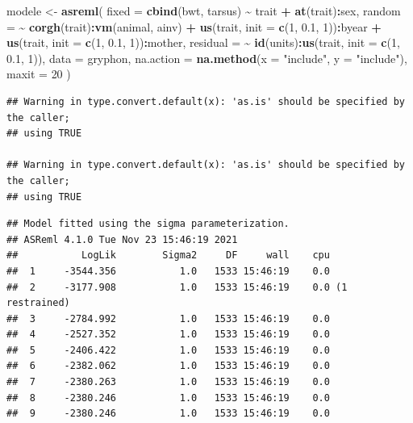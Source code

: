 \documentclass[
  12pt,
]{book}
\newenvironment{Shaded}{\begin{snugshade}}{\end{snugshade}}
\newcommand{\DataTypeTok}[1]{\textcolor[rgb]{0.13,0.29,0.53}{#1}}
\newcommand{\DecValTok}[1]{\textcolor[rgb]{0.00,0.00,0.81}{#1}}
\newcommand{\FloatTok}[1]{\textcolor[rgb]{0.00,0.00,0.81}{#1}}
\newcommand{\KeywordTok}[1]{\textcolor[rgb]{0.13,0.29,0.53}{\textbf{#1}}}
\newcommand{\NormalTok}[1]{#1}
\newcommand{\OperatorTok}[1]{\textcolor[rgb]{0.81,0.36,0.00}{\textbf{#1}}}
\newcommand{\StringTok}[1]{\textcolor[rgb]{0.31,0.60,0.02}{#1}}
\begin{document}
\begin{Shaded}
\begin{Highlighting}[]
\NormalTok{modele \textless{}{-}}\StringTok{ }\KeywordTok{asreml}\NormalTok{(}
  \DataTypeTok{fixed =} \KeywordTok{cbind}\NormalTok{(bwt, tarsus) }\OperatorTok{\textasciitilde{}}\StringTok{ }\NormalTok{trait }\OperatorTok{+}\StringTok{ }\KeywordTok{at}\NormalTok{(trait)}\OperatorTok{:}\NormalTok{sex,}
  \DataTypeTok{random =} \OperatorTok{\textasciitilde{}}\StringTok{ }\KeywordTok{corgh}\NormalTok{(trait)}\OperatorTok{:}\KeywordTok{vm}\NormalTok{(animal, ainv) }\OperatorTok{+}
\StringTok{    }\KeywordTok{us}\NormalTok{(trait, }\DataTypeTok{init =} \KeywordTok{c}\NormalTok{(}\DecValTok{1}\NormalTok{, }\FloatTok{0.1}\NormalTok{, }\DecValTok{1}\NormalTok{))}\OperatorTok{:}\NormalTok{byear }\OperatorTok{+}
\StringTok{    }\KeywordTok{us}\NormalTok{(trait, }\DataTypeTok{init =} \KeywordTok{c}\NormalTok{(}\DecValTok{1}\NormalTok{, }\FloatTok{0.1}\NormalTok{, }\DecValTok{1}\NormalTok{))}\OperatorTok{:}\NormalTok{mother,}
  \DataTypeTok{residual =} \OperatorTok{\textasciitilde{}}\StringTok{ }\KeywordTok{id}\NormalTok{(units)}\OperatorTok{:}\KeywordTok{us}\NormalTok{(trait, }\DataTypeTok{init =} \KeywordTok{c}\NormalTok{(}\DecValTok{1}\NormalTok{, }\FloatTok{0.1}\NormalTok{, }\DecValTok{1}\NormalTok{)),}
  \DataTypeTok{data =}\NormalTok{ gryphon,}
  \DataTypeTok{na.action =} \KeywordTok{na.method}\NormalTok{(}\DataTypeTok{x =} \StringTok{"include"}\NormalTok{, }\DataTypeTok{y =} \StringTok{"include"}\NormalTok{),}
  \DataTypeTok{maxit =} \DecValTok{20}
\NormalTok{)}
\end{Highlighting}
\end{Shaded}

\begin{verbatim}
## Warning in type.convert.default(x): 'as.is' should be specified by the caller;
## using TRUE

## Warning in type.convert.default(x): 'as.is' should be specified by the caller;
## using TRUE
\end{verbatim}

\begin{verbatim}
## Model fitted using the sigma parameterization.
## ASReml 4.1.0 Tue Nov 23 15:46:19 2021
##           LogLik        Sigma2     DF     wall    cpu
##  1     -3544.356           1.0   1533 15:46:19    0.0
##  2     -3177.908           1.0   1533 15:46:19    0.0 (1 restrained)
##  3     -2784.992           1.0   1533 15:46:19    0.0
##  4     -2527.352           1.0   1533 15:46:19    0.0
##  5     -2406.422           1.0   1533 15:46:19    0.0
##  6     -2382.062           1.0   1533 15:46:19    0.0
##  7     -2380.263           1.0   1533 15:46:19    0.0
##  8     -2380.246           1.0   1533 15:46:19    0.0
##  9     -2380.246           1.0   1533 15:46:19    0.0
\end{verbatim}
\end{document}
